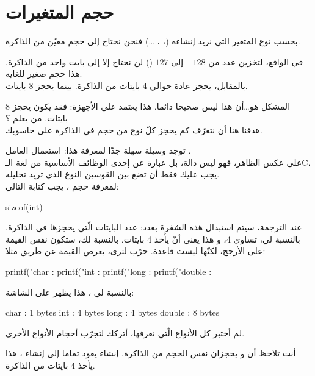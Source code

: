 \section{حجم المتغيرات}

بحسب نوع المتغير التي نريد إنشاءه
(،
،
\dots)
فنحن نحتاج إلى حجم معيّن من الذاكرة.

في الواقع، لتخزين عدد من
$-128$
إلى
$127$
()
لن نحتاج إلا إلى بايت واحد من الذاكرة. هذا حجم صغير للغاية.\\
بالمقابل،
يحجز عادة حوالي 4 بايتات من الذاكرة. بينما
يحجز 8 بايتات.

المشكل هو\dots أن هذا ليس  صحيحا دائما. هذا يعتمد على الأجهزة: فقد يكون
يحجز 8 بايتات. من يعلم ؟\\
هدفنا هنا أن نتعرّف كم يحجز كلّ نوع من حجم في الذاكرة على حاسوبك.

توجد وسيلة سهلة جدّا لمعرفة هذا: استعمال العامل
.\\
على عكس الظاهر، فهو ليس دالة، بل عبارة عن إحدى الوظائف الأساسية من لغة الـ\textenglish{C}،
يجب عليك فقط أن تضع بين القوسين النوع الذي تريد تحليله.\\
لمعرفة حجم
،
يجب كتابة التالي:

\begin{Csource}
sizeof(int)
\end{Csource}

عند الترجمة، سيتم استبدال هذه الشفرة بعدد: عدد البايتات الّتي يحجزها
في الذاكرة. بالنسبة لي،
تساوي 4، و هذا يعني أنّ
يأخذ 4 بايتات. بالنسبة لك، ستكون نفس القيمة على الأرجح، لكنّها ليست قاعدة. جرّب لترى، بعرض القيمة عن طريق
مثلا:

\begin{Csource}
printf("char : %
printf("int : %
printf("long : %
printf("double : %
\end{Csource}

بالنسبة لي ، هذا يظهر على الشاشة:

\begin{Console}
char : 1 bytes
int : 4 bytes
long : 4 bytes
double : 8 bytes
\end{Console}

لم أختبر كل الأنواع الّتي نعرفها، أتركك لتجرّب أحجام الأنواع الأخرى.

أنت تلاحظ أن
و
يحجزان نفس الحجم من الذاكرة. إنشاء
يعود تماما إلى إنشاء
،
هذا يأخذ 4 بايتات من الذاكرة.

